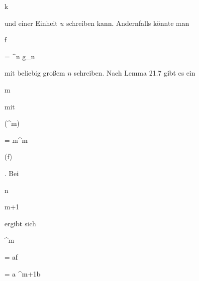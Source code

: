 {\mavergleichskette

{\vergleichskette

{k
}

{ \in }{\N
}

{  }{
}

{    }{
}

{   }{
}

}
{}{}{}
und einer Einheit $u$ schreiben kann. Andernfalls könnte man


\mavergleichskette

{\vergleichskette

{f
}

{ = }{ \pi^n g_n
}

{  }{
}

{    }{
}

{   }{
}

}
{}{}{}
mit beliebig großem $n$ schreiben. Nach
Lemma 21.7
gibt es ein


\mavergleichskette

{\vergleichskette

{m
}

{ \in }{\N
}

{  }{
}

{    }{
}

{   }{
}

}
{}{}{}
mit


\mavergleichskette

{\vergleichskette

{ (\pi^m)
}

{ = }{ {\mathfrak m}^m
}

{ \subseteq }{(f)
}

{    }{
}

{   }{
}

}
{}{}{.}
Bei


\mavergleichskette

{\vergleichskette

{n
}

{ \geq }{m+1
}

{  }{
}

{    }{
}

{   }{
}

}
{}{}{}
ergibt sich


\mavergleichskette

{\vergleichskette

{ \pi^m
}

{ = }{ af
}

{ = }{ a \pi^{m+1}b
}

{    }{
}

}}
